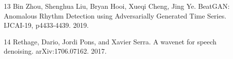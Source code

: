 \begin{itemize}
\item[13] Bin Zhou, Shenghua Liu, Bryan Hooi, Xueqi Cheng, Jing Ye. BeatGAN: Anomalous Rhythm Detection using Adversarially Generated Time Series. IJCAI-19, p4433-4439. 2019.
\item[14] Rethage, Dario, Jordi Pons, and Xavier Serra. A wavenet for speech denoising. arXiv:1706.07162. 2017.

\end{itemize}
